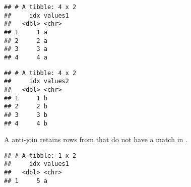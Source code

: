 \documentclass[krantz2]{krantz}\usepackage{knitr}
\begin{document}
\begin{knitrout}\footnotesize
{}\color{fgcolor}\begin{kframe}
\begin{alltt}
\hlstd{(}   
\end{alltt}


{\ttfamily\noindent\itshape\color{messagecolor}{\#\# Joining with `by = join\_by(idx)`}}\begin{verbatim}
## # A tibble: 4 x 2
##     idx values1
##   <dbl> <chr>  
## 1     1 a      
## 2     2 a      
## 3     3 a      
## 4     4 a
\end{verbatim}
\end{kframe}
\end{knitrout}

\begin{knitrout}\footnotesize
{}\color{fgcolor}\begin{kframe}
\begin{alltt}
\hlstd{(}   
\end{alltt}


{\ttfamily\noindent\itshape\color{messagecolor}{\#\# Joining with `by = join\_by(idx)`}}\begin{verbatim}
## # A tibble: 4 x 2
##     idx values2
##   <dbl> <chr>  
## 1     1 b      
## 2     2 b      
## 3     3 b      
## 4     4 b
\end{verbatim}
\end{kframe}
\end{knitrout}

A anti-join retains rows from  that do not have a match in .

\begin{knitrout}\footnotesize
{}\color{fgcolor}\begin{kframe}
\begin{alltt}
\hlstd{(}   
\end{alltt}


{\ttfamily\noindent\itshape\color{messagecolor}{\#\# Joining with `by = join\_by(idx)`}}\begin{verbatim}
## # A tibble: 1 x 2
##     idx values1
##   <dbl> <chr>  
## 1     5 a
\end{verbatim}
\end{kframe}
\end{knitrout}
\end{document}
